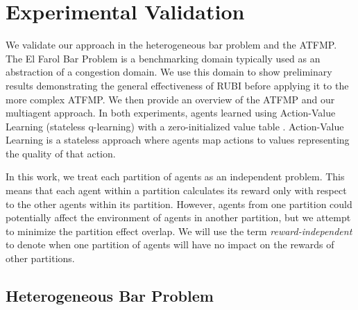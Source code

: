 \documentclass[smallcondensed]{svjour3}
\begin{document}
\section{Experimental Validation}

We validate our approach in the heterogeneous bar problem and the ATFMP. The El Farol Bar Problem \cite{BarProblem} is a benchmarking domain typically used as an abstraction of a congestion domain. We use this domain to show preliminary results demonstrating the general effectiveness of RUBI before applying it to the more complex ATFMP. We then provide an overview of the ATFMP and our multiagent approach. In both experiments, agents learned using Action-Value Learning (stateless q-learning) with a zero-initialized value table \cite{Watkins92q-learning}. Action-Value Learning is a stateless approach where agents map actions to values representing the quality of that action. 


In this work, we treat each partition of agents as an independent problem. This means that each agent within a partition calculates its reward only with respect to the other agents within its partition. However, agents from one partition could potentially affect the environment of agents in another partition, but we attempt to minimize the partition effect overlap. We will use the term \textit{reward-independent} to denote when one partition of agents will have no impact on the rewards of other partitions. 

\subsection{Heterogeneous Bar Problem}
\end{document}
